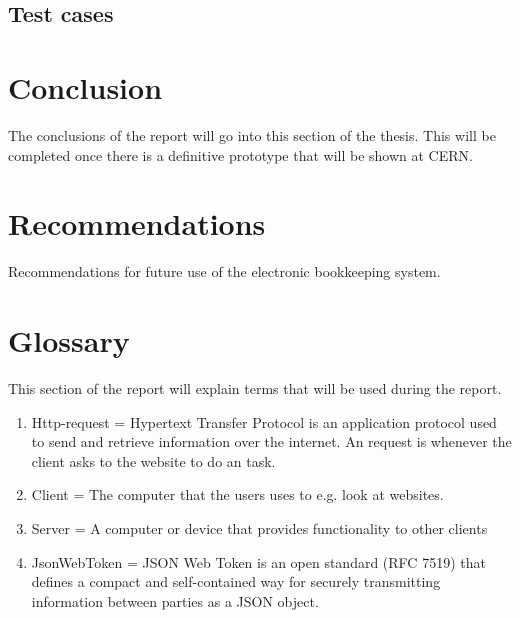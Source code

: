 \documentclass[paper=a4, fontsize=11pt,twoside]{scrartcl}	%
\begin{document}
\newpage
\subsection{Test cases}


\newpage
\section{Conclusion}
The conclusions of the report will go into this section of the thesis. This will be completed once there is a definitive prototype that will be shown at CERN.
\newpage
\section{Recommendations}
Recommendations for future use of the electronic bookkeeping system.
\newpage

\section{Glossary}
This section of the report will explain terms that will be used during the report. 
\begin{enumerate}
\item Http-request = Hypertext Transfer Protocol is an application protocol used to send and retrieve information over the internet. An request is whenever the client asks to the website to do an task.
\item Client = The computer that the users uses to e.g. look at websites.
\item Server = A computer or device that provides functionality to other clients
\item JsonWebToken = JSON Web Token is an open standard (RFC 7519) that defines a compact and self-contained way for securely transmitting information between parties as a JSON object.
\end{enumerate}


\newpage
\end{document}
